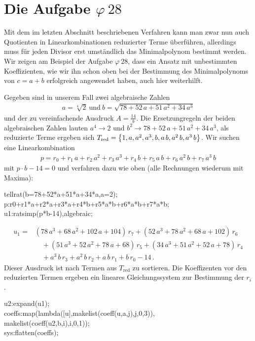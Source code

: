 \documentclass[11pt,a4paper]{article}
\newcommand{\cas}[1]{{\sc #1}}
\newcommand{\red}{\mathrm{red}}
\begin{document}
\section{Die Aufgabe $\varphi\ 28$}

Mit dem im letzten Abschnitt beschriebenen Verfahren kann man zwar nun auch
Quotienten in Linearkombinationen reduzierter Terme überführen, allerdings muss
für jeden Divisor erst umständlich das Minimalpolynom bestimmt werden. Wir
zeigen am Beispiel der Aufgabe $\varphi\ 28$, dass ein Ansatz mit unbestimmten
Koeffizienten, wie wir ihn schon oben bei der Bestimmung des Minimalpolynoms
von $c=a+b$ erfolgreich angewendet haben, auch hier weiterhilft.

Gegeben sind in unserem Fall zwei algebraische Zahlen 
\begin{gather*}
  a=\sqrt[4]{2}\ \text{und}\ b=\sqrt{78+52\,a+51\,a^2+34\,a^3}
\end{gather*}
und der zu vereinfachende Ausdruck $A=\frac{14}{b}$.  Die Ersetzungregeln der
beiden algebraischen Zahlen lauten $a^4\to 2$ und $b^2\to
78+52\,a+51\,a^2+34\,a^3$, als reduzierte Terme ergeben sich
$T_{\red}=\cbr{1,a,a^2,a^3,b,a\,b,a^2\,b,a^3\,b}$.  Wir suchen eine
Linearkombination
\begin{gather*}
  p=r_0+r_1\,a+r_2\,a^2+r_3\,a^3+r_4\,b+r_5\,a\,b+r_6\,a^2\,b+r_7\,a^3\,b
\end{gather*}
mit $p\cdot b-14=0$ und verfahren dazu wie oben (alle Rechnungen wiederum mit
\cas{Maxima}):
\begin{code}
  tellrat(b=78+52*a+51*a+34*a,a=2);\\
  p:r0+r1*a+r2*a+r3*a+r4*b+r5*a*b+r6*a*b+r7*a*b;\\
  u1:ratsimp(p*b-14),algebraic;
\end{code}
\begin{align*}
  u_1= & (78\,a^3+68\,a^2+102\,a+104)\,r_7
  +(52\,a^3+78\,a^2+68\,a+102)\,r_6\\ &\quad +(51\,a^3+52\,a^2+78\,a+68)\,r_5
  +(34\,a^3+51\,a^2+52\,a+78)\,r_4\\ &\quad +a^3\,b\,r_3
  +a^2\,b\,r_2+a\,b\,r_1+b\,r_0-14\,.
\end{align*}
Dieser Ausdruck ist nach Termen aus $T_{\red}$ zu sortieren. Die Koeffizenten
vor den reduzierten Termen ergeben ein lineares Gleichungssystem zur Bestimmung
der $r_i$.
\begin{code}
  u2:expand(u1);\\
  coeffs:map(lambda([u],makelist(coeff(u,a,j),j,0,3)),\\\>\>
  makelist(coeff(u2,b,i),i,0,1));\\ 
  sys:flatten(coeffs);
\end{code}
\end{document}
